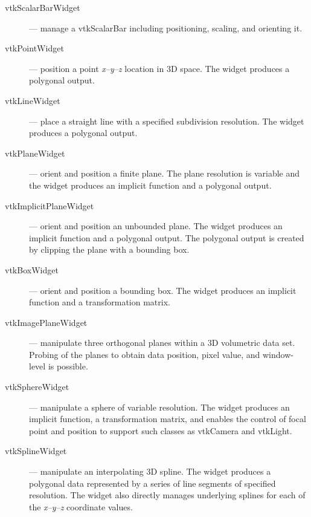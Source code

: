 \begin{description}

\item [vtkScalarBarWidget] --- manage a vtkScalarBar including positioning, scaling, and orienting it.

\item [vtkPointWidget] --- position a point \emph{x--y--z} location in 3D space. The widget produces a polygonal output.

\item [vtkLineWidget] --- place a straight line with a specified subdivision resolution. The widget produces a polygonal output.

\item [vtkPlaneWidget] --- orient and position a finite plane. The plane resolution is variable and the widget produces an implicit function and a polygonal output.

\item [vtkImplicitPlaneWidget] --- orient and position an unbounded plane. The widget produces an implicit function and a polygonal output. The polygonal output is created by clipping the plane with a bounding box.

\item [vtkBoxWidget] --- orient and position a bounding box. The widget produces an implicit function and a transformation matrix.

\item [vtkImagePlaneWidget] --- manipulate three orthogonal planes within a 3D volumetric data set. Probing of the planes to obtain data position, pixel value, and window-level is possible.

\item [vtkSphereWidget] --- manipulate a sphere of variable resolution. The widget produces an implicit function, a transformation matrix, and  enables the control of focal point and position to support such classes as vtkCamera and vtkLight.

\item [vtkSplineWidget] --- manipulate an interpolating 3D spline. The widget produces a polygonal data represented by a series of line segments of specified resolution. The widget also directly manages underlying splines for each of the \emph{x--y--z} coordinate values.

\end{description}

